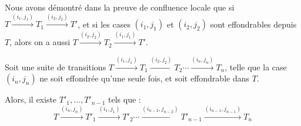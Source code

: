 \begin{rem} Nous avons démontré dans la preuve de confluence locale que si $T\xrightarrow{(i_1,j_1)}T_1\xrightarrow{(i_2,j_2)}T'$, et si les cases $(i_1,j_1)$ et $(i_2, j_2)$ sont effondrables depuis $T$, alors on a aussi $T\xrightarrow{(i_2,j_2)}T_2\xrightarrow{(i_1,j_1)}T'$.\end{rem}

\begin{coro} Soit une suite de transitions $T\xrightarrow{(i_1,j_1)}T_1\xrightarrow{(i_2,j_2)}T_2\cdots\xrightarrow{(i_n,j_n)}T_n$, telle que la case $(i_n, j_n)$ ne soit effondrée qu'une seule fois, et soit effondrable dans $T$. 

Alors, il existe $T'_1, \ldots, T'_{n-1}$ tels que : 
$$T\xrightarrow{(i_n,j_n)}T'_1\xrightarrow{(i_1,j_1)}T'_2\cdots\xrightarrow{(i_{n-2},j_{n-2})}T'_{n-1}\xrightarrow{(i_{n-1},j_{n-1})}T_n$$
 \end{coro}
 
